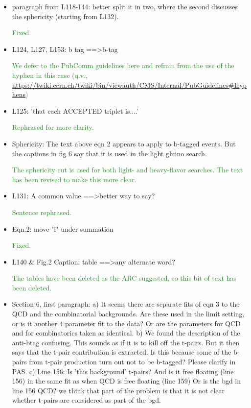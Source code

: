 \documentclass[paper=a4, fontsize=11pt]{scrartcl}
\begin{document}
\begin{itemize}
\item paragraph from L118-144: 
better split it in two, where the second discusses the sphericity (starting 
from L132). 

\textcolor{ForestGreen}{Fixed.}\\

\item L124, L127, L153: 
b tag ==\textgreater b-tag 

\textcolor{ForestGreen}{We defer to the PubComm guidelines here and refrain from the use of the hyphen
in this case (q.v., \url{https://twiki.cern.ch/twiki/bin/viewauth/CMS/Internal/PubGuidelines\#Hyphens})}\\


\item L125: 'that each ACCEPTED triplet is....' 

\textcolor{ForestGreen}{Rephrased for more clarity.}\\

\item Sphericity: 
The text above eqn 2 appears to apply to b-tagged events. But the captions 
in fig 6 say that it is used in the light gluino search. 

\textcolor{ForestGreen}{The sphericity cut is used for both light- and heavy-flavor searches.
The text has been revised to make this more clear.}\\

\item L131: 
A common value ==\textgreater better way to say? 

\textcolor{ForestGreen}{Sentence rephrased.}\\

\item Eqn.2: 
move "i" under summation 

\textcolor{ForestGreen}{Fixed.}\\

\item L140 \& Fig.2 Caption: 
table ==\textgreater any alternate word? 

\textcolor{ForestGreen}{The tables have been deleted as the ARC suggested, so this bit
of text has been deleted.}\\

\item Section 6, first paragraph: 
a) It seems there are separate fits of eqn 3 to the QCD and the combinatorial 
backgrounds. Are these used in the limit setting, or is it another 4 
parameter fit to the data? Or are the parameters for QCD and for 
combinatorics taken as identical. 
b) We found the description of the anti-btag confusing. This sounds as if it 
is to kill off the t-pairs. But it then says that the t-pair contribution is 
extracted. Is this because some of the b-pairs from t-pair production turn 
out not to be b-tagged? Please clarify in PAS. 
c) Line 156: Is 'this background' t-pairs? And is it free floating (line 156) 
in the same fit as when QCD is free floating (line 159) {Or is the bgd in 
line 156 QCD?} 
{we think that part of the problem is that it is not clear whether t-pairs 
are considered as part of the bgd.} 


\end{itemize}
\end{document}
